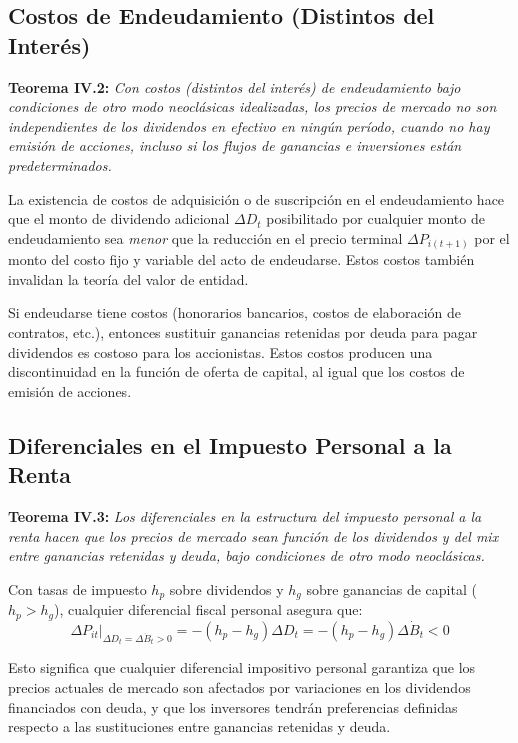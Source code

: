 \documentclass[12pt]{article}
\begin{document}
\subsection{Costos de Endeudamiento (Distintos del Inter\'es)}

\textbf{Teorema IV.2:} \textit{Con costos (distintos del inter\'es) de endeudamiento bajo condiciones de otro modo neocl\'asicas idealizadas, los precios de mercado no son independientes de los dividendos en efectivo en ning\'un per\'iodo, cuando no hay emisi\'on de acciones, incluso si los flujos de ganancias e inversiones est\'an predeterminados.}

La existencia de costos de adquisici\'on o de suscripci\'on en el endeudamiento hace que el monto de dividendo adicional $\Delta D_t$ posibilitado por cualquier monto de endeudamiento sea \textit{menor} que la reducci\'on en el precio terminal $\Delta P_{i(t+1)}$ por el monto del costo fijo y variable del acto de endeudarse. Estos costos tambi\'en invalidan la teor\'ia del valor de entidad.

\begin{intuicion}
Si endeudarse tiene costos (honorarios bancarios, costos de elaboraci\'on de contratos, etc.), entonces sustituir ganancias retenidas por deuda para pagar dividendos es costoso para los accionistas. Estos costos producen una discontinuidad en la funci\'on de oferta de capital, al igual que los costos de emisi\'on de acciones.
\end{intuicion}

\subsection{Diferenciales en el Impuesto Personal a la Renta}

\textbf{Teorema IV.3:} \textit{Los diferenciales en la estructura del impuesto personal a la renta hacen que los precios de mercado sean funci\'on de los dividendos y del mix entre ganancias retenidas y deuda, bajo condiciones de otro modo neocl\'asicas.}

Con tasas de impuesto $h_p$ sobre dividendos y $h_g$ sobre ganancias de capital ($h_p > h_g$), cualquier diferencial fiscal personal asegura que:
\begin{equation}
\Delta P_{it}\bigg|_{\Delta D_t = \Delta \dot{B}_t > 0} = -(h_p - h_g)\Delta D_t = -(h_p - h_g)\Delta \dot{B}_t < 0
\end{equation}

Esto significa que cualquier diferencial impositivo personal garantiza que los precios actuales de mercado son afectados por variaciones en los dividendos financiados con deuda, y que los inversores tendr\'an preferencias definidas respecto a las sustituciones entre ganancias retenidas y deuda.
\end{document}
